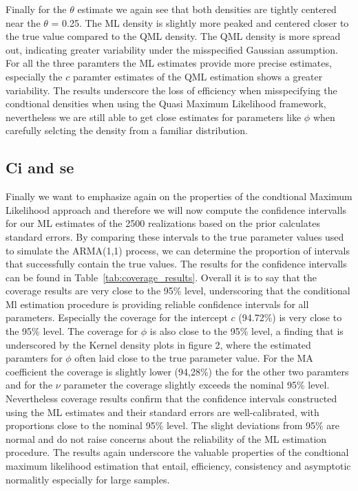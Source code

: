 \documentclass[a4paper,12pt]{article}
\begin{document}
Finally for the $\theta$ estimate we again see that both densities are tightly centered near the $\theta$ = 0.25. The ML density is slightly more peaked and centered closer to the true value compared to the QML density. The QML density is more spread out, indicating greater variability under the misspecified Gaussian assumption.
For all the three paramters the ML estimates provide more precise estimates, especially the $c$ paramter estimates of the QML estimation shows a greater variability.
The results underscore the loss of efficiency when misspecifying the condtional densities when using the Quasi Maximum Likelihood framework, nevertheless we are still able to get close estimates for parameters like $\phi$ when carefully selcting the density from a familiar distribution.

\subsection{Ci and se}
Finally we want to emphasize again on the properties of the condtional Maximum Likelihood approach and therefore we will now compute the confidence intervalls for our ML estimates of the 2500 realizations based on the prior calculates standard errors.
By comparing these intervals to the true parameter values used to simulate the ARMA(1,1) process, we can determine the proportion of intervals that successfully contain the true values. The results for the confidence intervalls can be found in Table~\ref{tab:coverage_results}. Overall it is to say that the coverage results are very close to the 95\% level, underscoring that the conditional Ml estimation procedure is providing reliable confidence intervals for all parameters. Especially the coverage for
the intercept $c$ (94.72\%) is very close to the 95\% level. 
The coverage for $\phi$ is also close to the 95\% level, a finding that is underscored by the Kernel density plots in figure 2, where the estimated paramters for $\phi$ often laid close to the true parameter value. 
For the MA coefficient the coverage is slightly lower (94,28\%) the for the other two paramters and for the $\nu$ parameter the coverage slightly exceeds the nominal 95\% level.
Nevertheless coverage results confirm that the confidence intervals constructed using the ML estimates and their standard errors are well-calibrated, with proportions close to the nominal 95\% level. The slight deviations from 95\% are normal and do not raise concerns about the reliability of the ML estimation procedure. The results again underscore the valuable properties of the condtional maximum likelihood estimation that entail, efficiency, consistency and asymptotic normalitly especially for large samples.
\end{document}
